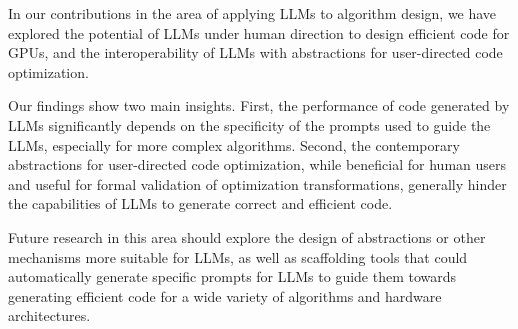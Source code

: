 In our contributions in the area of applying LLMs to algorithm design, we have explored the potential of LLMs under human direction to design efficient code for GPUs, and the interoperability of LLMs with abstractions for user-directed code optimization.

Our findings show two main insights. First, the performance of code generated by LLMs significantly depends on the specificity of the prompts used to guide the LLMs, especially for more complex algorithms. Second, the contemporary abstractions for user-directed code optimization, while beneficial for human users and useful for formal validation of optimization transformations, generally hinder the capabilities of LLMs to generate correct and efficient code.

Future research in this area should explore the design of abstractions or other mechanisms more suitable for LLMs, as well as scaffolding tools that could automatically generate specific prompts for LLMs to guide them towards generating efficient code for a wide variety of algorithms and hardware architectures.
